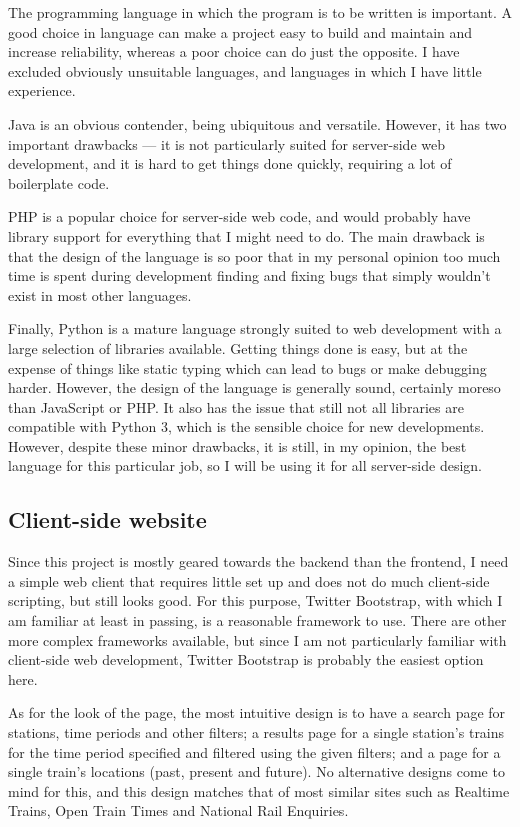\documentclass[a4paper,12pt]{article}
\begin{document}
The programming language in which the program is to be written is important. A
good choice in language can make a project easy to build and maintain and
increase reliability, whereas a poor choice can do just the opposite. I have
excluded obviously unsuitable languages, and languages in which I have little
experience.

Java is an obvious contender, being ubiquitous and versatile. However, it has
two important drawbacks --- it is not particularly suited for server-side web
development, and it is hard to get things done quickly, requiring a lot of
boilerplate code.

PHP is a popular choice for server-side web code, and would probably have
library support for everything that I might need to do. The main drawback is
that the design of the language is so poor that in my personal opinion too much
time is spent during development finding and fixing bugs that simply wouldn't
exist in most other languages.

Finally, Python is a mature language strongly suited to web development with a
large selection of libraries available. Getting things done is easy, but at the
expense of things like static typing which can lead to bugs or make debugging
harder. However, the design of the language is generally sound, certainly
moreso than JavaScript or PHP. It also has the issue that still not all
libraries are compatible with Python 3, which is the sensible choice for new
developments. However, despite these minor drawbacks, it is still, in my
opinion, the best language for this particular job, so I will be using it for
all server-side design.

\subsection{Client-side website}

Since this project is mostly geared towards the backend than the frontend, I
need a simple web client that requires little set up and does not do much
client-side scripting, but still looks good. For this purpose, Twitter
Bootstrap, with which I am familiar at least in passing, is a reasonable
framework to use. There are other more complex frameworks available, but since
I am not particularly familiar with client-side web development, Twitter
Bootstrap is probably the easiest option here.

As for the look of the page, the most intuitive design is to have a search page
for stations, time periods and other filters; a results page for a single
station's trains for the time period specified and filtered using the given
filters; and a page for a single train's locations (past, present and future).
No alternative designs come to mind for this, and this design matches that of
most similar sites such as Realtime Trains, Open Train Times and National Rail
Enquiries.
\end{document}
